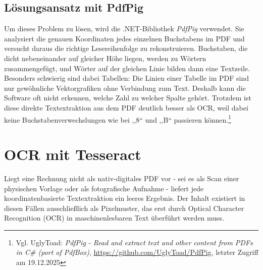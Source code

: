 \subsection{Lösungsansatz mit PdfPig}
Um dieses Problem zu lösen, wird die .NET-Bibliothek \textit{PdfPig} verwendet. Sie analysiert die genauen Koordinaten jedes einzelnen Buchstabens im PDF und versucht daraus die richtige Lesereihenfolge zu rekonstruieren. Buchstaben, die dicht nebeneinander auf gleicher Höhe liegen, werden zu Wörtern zusammengefügt, und Wörter auf der gleichen Linie bilden dann eine Textzeile.
Besonders schwierig sind dabei Tabellen: Die Linien einer Tabelle im PDF sind nur gewöhnliche Vektorgrafiken ohne Verbindung zum Text. Deshalb kann die Software oft nicht erkennen, welche Zahl zu welcher Spalte gehört. Trotzdem ist diese direkte Textextraktion aus dem PDF deutlich besser als OCR, weil dabei keine Buchstabenverwechslungen wie bei ,,8`` und ,,B`` passieren können.\footnote{Vgl. UglyToad: \textit{PdfPig - Read and extract text and other content from PDFs in C\# (port of PdfBox)}, \url{https://github.com/UglyToad/PdfPig}, letzter Zugriff am 19.12.2025}

\section{OCR mit Tesseract}
\label{sec:ocr}

Liegt eine Rechnung nicht als nativ-digitales PDF vor - sei es als Scan einer physischen Vorlage oder als fotografische Aufnahme - liefert jede koordinatenbasierte Textextraktion ein leeres Ergebnis. Der Inhalt existiert in diesen Fällen ausschließlich als Pixelmuster, das erst durch Optical Character Recognition (OCR) in maschinenlesbaren Text überführt werden muss.

